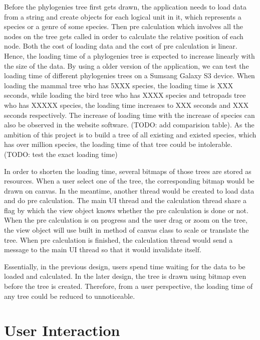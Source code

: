 \documentclass[MSc]{icldt}
\begin{document}
Before the phylogenies tree first gets drawn, the application needs to load data from a string and create objects for each logical unit in it, which represents a species or a genre of some species. Then pre calculation which involves all the nodes on the tree gets called in order to calculate the relative position of each node. Both the cost of loading data and the cost of pre calculation is linear. Hence, the loading time of a phylogenies tree is expected to increase linearly with the size of the data. By using a older version of the application, we can test the loading time of different phylogenies trees on a Sumsang Galaxy S3 device. When loading the mammal tree who has 5XXX species, the loading time is XXX seconds, while loading the bird tree who has XXXX species and tetropads tree who has XXXXX species, the loading time increases to XXX seconds and XXX seconds respectively. The increase of loading time with the increase of species can also be observed in the website software. (TODO: add comparision table). As the ambition of this project is to build a tree of all existing and existed species, which has over million species, the loading time of that tree could be intolerable.(TODO: test the exact loading time)

In order to shorten the loading time, several bitmaps of those trees are stored as resources. When a user select one of the tree, the corresponding bitmap would be drawn on canvas. In the meantime, another thread would be created to load data and do pre calculation. The main UI thread and the calculation thread share a flag by which the view object knows whether the pre calculation is done or not. When the pre calculation is on progress and the user drag or zoom on the tree, the view object will use built in method of canvas class to scale or translate the tree. When pre calculation is finished, the calculation thread would send a message to the main UI thread so that it would invalidate itself. 

Essentially, in the previous design, users spend time waiting for the data to be loaded and calculated. In the later design, the tree is drawn using bitmap even before the tree is created. Therefore, from a user perspective, the loading time of any tree could be reduced to unnoticeable. 

\section{User Interaction}
\end{document}
